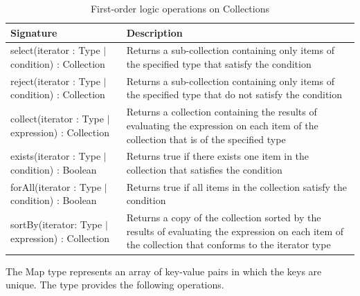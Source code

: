 \begin{longtable} {|p{5.5cm}|p{6.5cm}|}
			
			\caption{First-order logic operations on Collections}
			\label{tab:FirstOrderOperations}\\
			
			\hline
							
			\textbf{Signature} & \textbf{Description} \\\hline

			select(iterator : Type $|$ condition) : Collection & Returns a sub-collection containing only items of the specified type that satisfy the condition \\\hline 
			
			reject(iterator : Type $|$ condition) : Collection & Returns a sub-collection containing only items of the specified type that do not satisfy the condition \\\hline
			
			collect(iterator : Type $|$ expression) : Collection &  Returns a collection containing the results of evaluating the expression on each item of the collection that is of the specified type \\\hline
			
			exists(iterator : Type $|$ condition) : Boolean & Returns true if there exists one item in the collection that satisfies the condition \\\hline
			
			forAll(iterator : Type $|$ condition) : Boolean & Returns true if all items in the collection satisfy the condition \\\hline
			
			
			sortBy(iterator: Type $|$ expression) : Collection & Returns a copy of the collection sorted by the results of evaluating the expression on each item of the collection that conforms to the iterator type \\\hline

\end{longtable}

The Map type represents an array of key-value pairs in which the keys are unique. The type provides the following operations.

